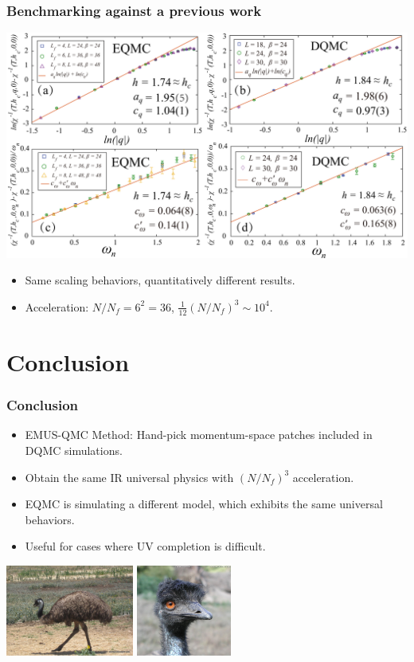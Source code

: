 \documentclass[xcolor=table, 10pt, aspectratio=43]{beamer}
\begin{document}
\begin{frame}
  \frametitle{Benchmarking against a previous work}
  \begin{center}
    \includegraphics[width=\textwidth]{chiwqanalysis.pdf}
  \end{center}
\begin{itemize}
  \item Same scaling behaviors, quantitatively different results.
  \item Acceleration: $N/N_f=6^2=36$, $\frac1{12}(N/N_f)^3 \sim 10^4$.
\end{itemize}
\end{frame}

\section{Conclusion}

\begin{frame}
  \frametitle{Conclusion}
  \begin{itemize}
    \item EMUS-QMC Method: Hand-pick momentum-space patches included in DQMC simulations.
    \item Obtain the same IR universal physics with $(N/N_f)^3$ acceleration.
    \item EQMC is simulating a \alert{different} model, which exhibits the same universal behaviors.
    \item Useful for cases where UV completion is difficult.
  \end{itemize}
  \begin{center}
    \includegraphics[height=3cm]{emu}
    \includegraphics[height=3cm]{emu2}
  \end{center}
\end{frame}
\end{document}
